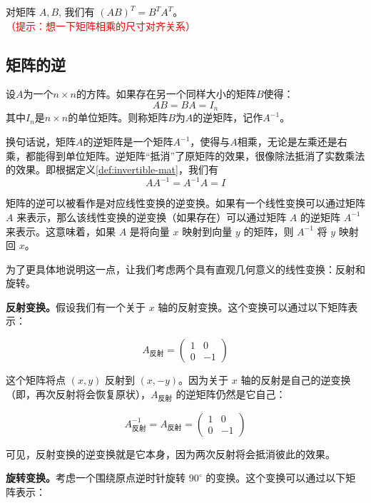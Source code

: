 \begin{theorem}[转置运算的性质] \label{thm:transpose-property}
    对矩阵 $A, B$, 我们有 $(A B)^T=B^T A^T$。\textcolor{red}{（提示：想一下矩阵相乘的尺寸对齐关系）}
\end{theorem}

\subsection{矩阵的逆}

\begin{definition} \label{def:invertible-mat}
    设$A$为一个$n \times n$的方阵。如果存在另一个同样大小的矩阵$B$使得：
$$AB = BA = I_n$$
其中$I_n$是$n \times n$的单位矩阵。则称矩阵$B$为$A$的逆矩阵，记作$A^{-1}$。
\end{definition}

换句话说，矩阵$A$的逆矩阵是一个矩阵$A^{-1}$，使得与$A$相乘，无论是左乘还是右乘，都能得到单位矩阵。逆矩阵“抵消”了原矩阵的效果，很像除法抵消了实数乘法的效果。即根据定义\ref{def:invertible-mat}，我们有
$$
A A^{-1}=A^{-1} A=I
$$

矩阵的逆可以被看作是对应线性变换的逆变换。如果有一个线性变换可以通过矩阵 \(A\) 来表示，那么该线性变换的逆变换（如果存在）可以通过矩阵 \(A\) 的逆矩阵 \(A^{-1}\) 来表示。这意味着，如果 \(A\) 是将向量 \(x\) 映射到向量 \(y\) 的矩阵，则 \(A^{-1}\) 将 \(y\) 映射回 \(x\)。

\vspace{0.5cm}

为了更具体地说明这一点，让我们考虑两个具有直观几何意义的线性变换：反射和旋转。

\textbf{反射变换。}假设我们有一个关于 \(x\) 轴的反射变换。这个变换可以通过以下矩阵表示：

\[ A_{\text{反射}} = \begin{pmatrix} 1 & 0 \\ 0 & -1 \end{pmatrix} \]

这个矩阵将点 \( (x, y) \) 反射到 \( (x, -y) \)。因为关于 \(x\) 轴的反射是自己的逆变换（即，再次反射将会恢复原状），\(A_{\text{反射}}\) 的逆矩阵仍然是它自己：

\[ A_{\text{反射}}^{-1} = A_{\text{反射}} = \begin{pmatrix} 1 & 0 \\ 0 & -1 \end{pmatrix} \]

可见，反射变换的逆变换就是它本身，因为两次反射将会抵消彼此的效果。

\textbf{旋转变换。}考虑一个围绕原点逆时针旋转 \(90^\circ\) 的变换。这个变换可以通过以下矩阵表示：

